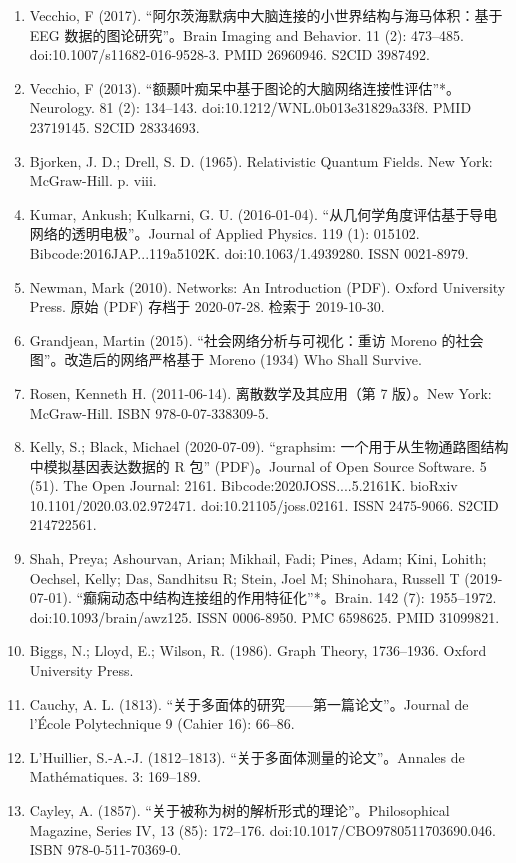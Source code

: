\begin{enumerate}
\item Vecchio, F (2017). “阿尔茨海默病中大脑连接的小世界结构与海马体积：基于 EEG 数据的图论研究”。Brain Imaging and Behavior. 11 (2): 473–485. doi:10.1007/s11682-016-9528-3. PMID 26960946. S2CID 3987492.
\item Vecchio, F (2013). “额颞叶痴呆中基于图论的大脑网络连接性评估”*。Neurology. 81 (2): 134–143. doi:10.1212/WNL.0b013e31829a33f8. PMID 23719145. S2CID 28334693.
\item Bjorken, J. D.; Drell, S. D. (1965). Relativistic Quantum Fields. New York: McGraw-Hill. p. viii.
\item Kumar, Ankush; Kulkarni, G. U. (2016-01-04). “从几何学角度评估基于导电网络的透明电极”。Journal of Applied Physics. 119 (1): 015102. Bibcode:2016JAP...119a5102K. doi:10.1063/1.4939280. ISSN 0021-8979.
\item Newman, Mark (2010). Networks: An Introduction (PDF). Oxford University Press. 原始 (PDF) 存档于 2020-07-28. 检索于 2019-10-30.
\item Grandjean, Martin (2015). “社会网络分析与可视化：重访 Moreno 的社会图”。改造后的网络严格基于 Moreno (1934) Who Shall Survive.
\item Rosen, Kenneth H. (2011-06-14). 离散数学及其应用（第 7 版）。New York: McGraw-Hill. ISBN 978-0-07-338309-5.
\item Kelly, S.; Black, Michael (2020-07-09). “graphsim: 一个用于从生物通路图结构中模拟基因表达数据的 R 包” (PDF)。Journal of Open Source Software. 5 (51). The Open Journal: 2161. Bibcode:2020JOSS....5.2161K. bioRxiv 10.1101/2020.03.02.972471. doi:10.21105/joss.02161. ISSN 2475-9066. S2CID 214722561.
\item Shah, Preya; Ashourvan, Arian; Mikhail, Fadi; Pines, Adam; Kini, Lohith; Oechsel, Kelly; Das, Sandhitsu R; Stein, Joel M; Shinohara, Russell T (2019-07-01). “癫痫动态中结构连接组的作用特征化”*。Brain. 142 (7): 1955–1972. doi:10.1093/brain/awz125. ISSN 0006-8950. PMC 6598625. PMID 31099821.
\item Biggs, N.; Lloyd, E.; Wilson, R. (1986). Graph Theory, 1736–1936. Oxford University Press.
\item Cauchy, A. L. (1813). “关于多面体的研究——第一篇论文”。Journal de l'École Polytechnique 9 (Cahier 16): 66–86.
\item L'Huillier, S.-A.-J. (1812–1813). “关于多面体测量的论文”。Annales de Mathématiques. 3: 169–189.
\item Cayley, A. (1857). “关于被称为树的解析形式的理论”。Philosophical Magazine, Series IV, 13 (85): 172–176. doi:10.1017/CBO9780511703690.046. ISBN 978-0-511-70369-0.

\end{enumerate}
